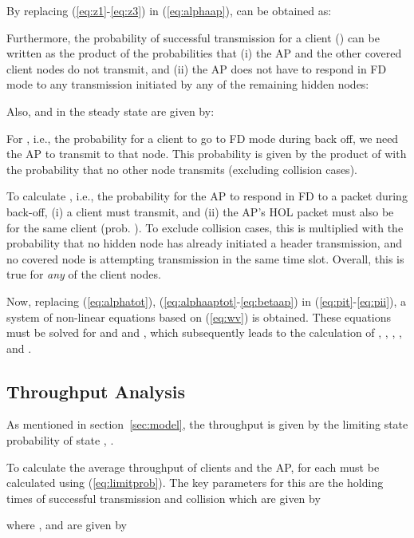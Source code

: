 \documentclass[10pt,journal,cspaper,compsoc]{IEEEtran}
\begin{document}
\normalsize

By replacing (\ref{eq:z1}-\ref{eq:z3}) in (\ref{eq:alphaap}),  can be obtained as:
\small

\normalsize

Furthermore, the probability of successful transmission for a client () can be written as the product of the probabilities that (i) the AP and the other covered client nodes do not transmit, and (ii) the AP does not have to respond in FD mode to any transmission initiated by any of the remaining hidden nodes: 


Also,  and  in the steady state are given by:

For , i.e., the probability for a client to go to FD mode during back off, we need the AP to transmit to that node. This probability is given by the product of  with the probability that no other node transmits (excluding collision cases).

To calculate , i.e., the probability for the AP to respond in FD to a packet during back-off, (i) a client must  transmit, and (ii) the AP's HOL packet must also be for the same client (prob. ). To exclude collision cases, this is multiplied with the probability that no hidden node has already initiated a header transmission, and no covered node is attempting transmission in the same time slot. Overall, this is true for {\em any} of the  client nodes. 

Now, replacing (\ref{eq:alphatot}), (\ref{eq:alphaaptot}-\ref{eq:betaap}) in (\ref{eq:pit}-\ref{eq:pii}), a system of non-linear equations based on (\ref{eq:wv}) is obtained. These equations must be solved for  and  and , which subsequently leads to the calculation of  , , , ,  and .


\subsection{Throughput Analysis}
As mentioned in section~\ref{sec:model}, the throughput is given by the limiting state probability of state , . 

To calculate the average throughput of clients and the AP,  for each must be calculated using (\ref{eq:limitprob}). The key parameters for this are the holding times of successful transmission and collision which are given by 

where ,  and  are given by
\end{document}
